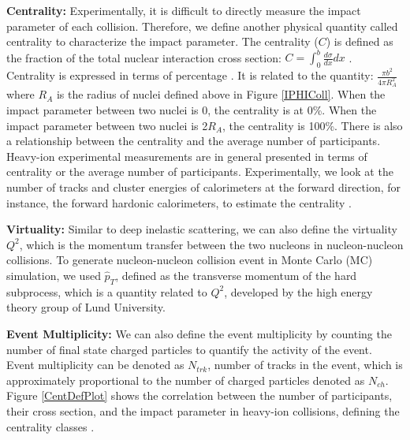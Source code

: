 \textbf{Centrality:} Experimentally, it is difficult to directly measure the impact parameter of each collision. Therefore, we define another physical quantity called centrality to characterize the impact parameter. The centrality ($C$) is defined as the fraction of the total nuclear interaction cross section: $C = \int^b_0 \frac{d\sigma}{dx} dx$ . Centrality is expressed in terms of percentage \cite{CentDef}. It is related to the quantity: $\frac{\pi b^2}{4\pi R_A^2}$ where $R_A$ is the radius of nuclei defined above in Figure \ref{IPHIColl}. When the impact parameter between two nuclei is 0, the centrality is at 0\%. When the impact parameter between two nuclei is 2$R_A$, the centrality is 100\%. There is also a relationship between the centrality and the average number of participants. Heavy-ion experimental measurements are in general presented in terms of centrality or the average number of participants. Experimentally, we look at the number of tracks and cluster energies of calorimeters at the forward direction, for instance, the forward hardonic calorimeters, to estimate the centrality \cite{ALICEZDC,CMSZDC,ATLASZDC}. 


\textbf{Virtuality:} Similar to deep inelastic scattering, we can also define the virtuality $Q^2$, which is the momentum transfer between the two nucleons in nucleon-nucleon collisions. To generate nucleon-nucleon collision event in Monte Carlo (MC) simulation, we used $\hat p_T$, defined as the transverse momentum of the hard subprocess, which is a quantity related to $Q^2$, developed by the high energy theory group of Lund University.


\textbf{Event Multiplicity:} We can also define the event multiplicity by counting the number of final state charged particles to quantify the activity of the event. Event multiplicity can be denoted as $N_{trk}$, number of tracks in the event, which is approximately proportional to the number of charged particles denoted as $N_{ch}$. Figure \ref{CentDefPlot} shows the correlation between the number of participants, their cross section, and the impact parameter in heavy-ion collisions, defining the centrality classes \cite{CentPlot}.


